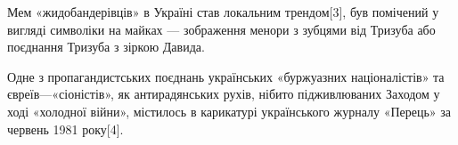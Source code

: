 \begin{itemize}
\begin{multicols}{2}
Мем «жидобандерівців» в Україні став локальним трендом[3], був помічений у
вигляді символіки на майках — зображення менори з зубцями від Тризуба або
поєднання Тризуба з зіркою Давида.


Одне з пропагандистських поєднань українських «буржуазних націоналістів» та
євреїв—«сіоністів», як антирадянських рухів, нібито підживлюваних Заходом у
ході «холодної війни», містилось в карикатурі українського журналу «Перець» за
червень 1981 року[4].


\end{multicols}

\end{itemize} %
